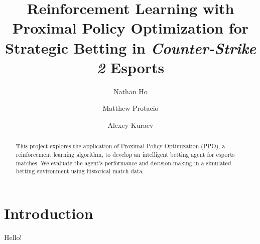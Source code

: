 \documentclass[sigconf]{acmart}
\title{Reinforcement Learning with Proximal Policy Optimization for Strategic Betting in \textit{Counter-Strike 2} Esports}
\author{Nathan Ho}
\affiliation{%
  \institution{Drexel University}
  \city{Philadelphia}
  \state{PA}
  \country{USA}
}
\author{Matthew Protacio}
\affiliation{%
  \institution{Drexel University}
  \city{Philadelphia}
  \state{PA}
  \country{USA}
}
\author{Alexey Kuraev}
\affiliation{%
  \institution{Drexel University}
  \city{Philadelphia}
  \state{PA}
  \country{USA}
}
\begin{document}
\begin{abstract}
This project explores the application of Proximal Policy Optimization (PPO), a reinforcement learning algorithm, to develop an intelligent betting agent for esports matches. We evaluate the agent's performance and decision-making in a simulated betting environment using historical match data.
\end{abstract}

\maketitle



\section{Introduction}
Hello!
\end{document}
